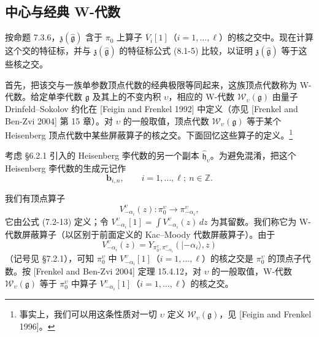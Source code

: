 
\subsection{中心与经典 W-代数}

按命题 7.3.6，$\mathfrak z(\hat{\mathfrak g})$ 含于 $\pi_0$ 上算子 $\overline V_i[1]$（$i=1,\dots,\ell$）的核之交中。现在计算这个交的特征标，并与 $\mathfrak z(\hat{\mathfrak g})$ 的特征标公式 (8.1-5) 比较，以证明 $\mathfrak z(\hat{\mathfrak g})$ 等于这些核之交。

首先，把该交与一族单参数顶点代数的经典极限等同起来，这族顶点代数称为 W-代数。给定单李代数 $\mathfrak g$ 及其上的不变内积 $\upsilon$，相应的 W-代数 $\mathcal W_\upsilon(\mathfrak g)$ 由量子 Drinfeld–Sokolov 约化在 [Feigin and Frenkel 1992] 中定义（亦见 [Frenkel and Ben-Zvi 2004] 第 15 章）。对 $\upsilon$ 的一般取值，顶点代数 $\mathcal W_\upsilon(\mathfrak g)$ 等于某个 Heisenberg 顶点代数中某些屏蔽算子的核之交。下面回忆这些算子的定义。\footnote{事实上，我们可以用这条性质对一切 $\upsilon$ 定义 $\mathcal W_\upsilon(\mathfrak g)$，见 [Feigin and Frenkel 1996]。}

考虑 §6.2.1 引入的 Heisenberg 李代数的另一个副本 $\hat{\mathfrak h}_\upsilon$。为避免混淆，把这个 Heisenberg 李代数的生成元记作
\[
    \mathbf b_{i,n},\qquad i=1,\dots,\ell;\ n\in\mathbb Z.
\]

我们有顶点算子
\[
    V^\upsilon_{-\alpha_i}(z):\pi^\upsilon_0\longrightarrow\pi^\upsilon_{-\alpha_i},
\]
它由公式 (7.2-13) 定义；令 $V^\upsilon_{-\alpha_i}[1]=\int V^\upsilon_{-\alpha_i}(z)\,dz$ 为其留数。我们称它为 W-代数屏蔽算子（以区别于前面定义的 Kac–Moody 代数屏蔽算子）。由于
\[
    V^\upsilon_{-\alpha_i}(z)=Y_{\pi^\upsilon_0,\pi^\upsilon_{-\alpha_i}}(|-\alpha_i\rangle,z)
\]
（记号见 §7.2.1），可知 $\pi^\upsilon_0$ 中 $V^\upsilon_{-\alpha_i}[1]$（$i=1,\dots,\ell$）的核之交是 $\pi^\upsilon_0$ 的顶点子代数。按 [Frenkel and Ben-Zvi 2004] 定理 15.4.12，对 $\upsilon$ 的一般取值，W-代数 $\mathcal W_\upsilon(\mathfrak g)$ 等于 $\pi^\upsilon_0$ 中算子 $V^\upsilon_{-\alpha_i}[1]$（$i=1,\dots,\ell$）的核之交。


